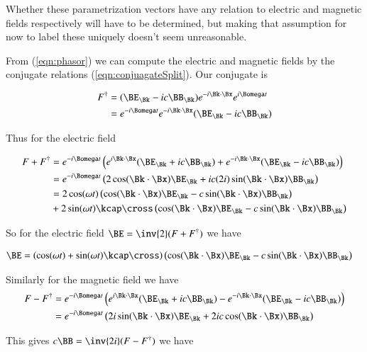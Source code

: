 Whether these parametrization vectors have any relation to electric and magnetic fields respectively will have to be determined, but making that assumption for now to label these uniquely doesn't seem unreasonable.

From (\ref{eqn:phasor}) we can compute the electric and magnetic fields by the conjugate relations (\ref{eqn:conjuagateSplit}).  Our conjugate is

\begin{align*}
F^\dagger
&= (\BE_\Bk - i c \BB_\Bk) e^{-i \Bk \cdot \Bx} e^{i\Bomega t} \\
&=
e^{-i\Bomega t}
e^{-i \Bk \cdot \Bx}
(\BE_\Bk - i c \BB_\Bk)
\end{align*}

Thus for the electric field

\begin{align*}
F + F^\dagger
&=
e^{-i\Bomega t} \left(
 e^{i \Bk \cdot \Bx} (\BE_\Bk + i c \BB_\Bk)
+e^{-i \Bk \cdot \Bx} (\BE_\Bk - i c \BB_\Bk)
\right) \\
&=
e^{-i\Bomega t} \left(
 2 \cos(\Bk \cdot \Bx) \BE_\Bk
+ i c (2 i) \sin(\Bk \cdot \Bx) \BB_\Bk
\right) \\
&=
2 \cos(\omega t) \left(
 \cos(\Bk \cdot \Bx) \BE_\Bk
- c \sin(\Bk \cdot \Bx) \BB_\Bk
\right) \\
&+ 2
\sin(\omega t)
\kcap \cross
\left(
 \cos(\Bk \cdot \Bx) \BE_\Bk
- c \sin(\Bk \cdot \Bx) \BB_\Bk
\right) \\
\end{align*}

So for the electric field $\BE = \inv{2}(F + F^\dagger)$ we have

\begin{align}\label{eqn:electricSplit}
\BE &=
\left( \cos(\omega t) + \sin(\omega t) \kcap \cross \right)
\left(
 \cos(\Bk \cdot \Bx) \BE_\Bk
- c \sin(\Bk \cdot \Bx) \BB_\Bk
\right)
\end{align}

Similarly for the magnetic field we have
\begin{align*}
F - F^\dagger
&=
e^{-i\Bomega t} \left(
 e^{i \Bk \cdot \Bx} (\BE_\Bk + i c \BB_\Bk)
-e^{-i \Bk \cdot \Bx} (\BE_\Bk - i c \BB_\Bk)
\right) \\
&=
e^{-i\Bomega t} \left(
 2 i \sin(\Bk \cdot \Bx) \BE_\Bk
+ 2 i c \cos(\Bk \cdot \Bx) \BB_\Bk
\right) \\
\end{align*}

This gives $c \BB = \inv{2i}(F - F^\dagger)$ we have

